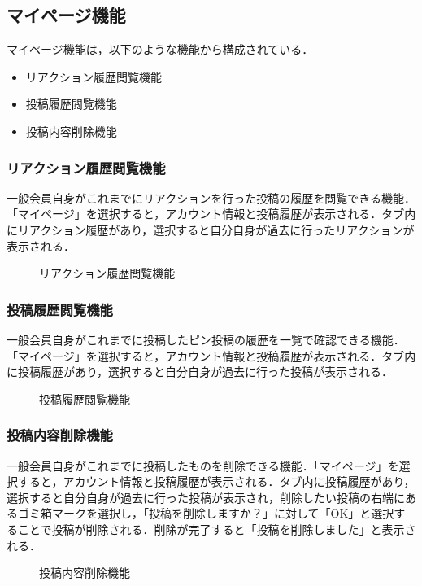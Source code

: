 \subsection{マイページ機能}
マイページ機能は，以下のような機能から構成されている．

\begin{itemize}
  \item リアクション履歴閲覧機能
  \item 投稿履歴閲覧機能
  \item 投稿内容削除機能
\end{itemize}

\subsubsection{リアクション履歴閲覧機能}
一般会員自身がこれまでにリアクションを行った投稿の履歴を閲覧できる機能．「マイページ」を選択すると，アカウント情報と投稿履歴が表示される．タブ内にリアクション履歴があり，選択すると自分自身が過去に行ったリアクションが表示される．


\begin{figure}[H]
    \centering
    
    \caption{リアクション履歴閲覧機能}
    \label{fig:mypage_gen1}
\end{figure}

\subsubsection{投稿履歴閲覧機能}
一般会員自身がこれまでに投稿したピン投稿の履歴を一覧で確認できる機能．「マイページ」を選択すると，アカウント情報と投稿履歴が表示される．タブ内に投稿履歴があり，選択すると自分自身が過去に行った投稿が表示される．



\begin{figure}[H]
    \centering
    
    \caption{投稿履歴閲覧機能}
    \label{fig:mypage_gen2}
\end{figure}




\subsubsection{投稿内容削除機能}

一般会員自身がこれまでに投稿したものを削除できる機能．「マイページ」を選択すると，アカウント情報と投稿履歴が表示される．タブ内に投稿履歴があり，選択すると自分自身が過去に行った投稿が表示され，削除したい投稿の右端にあるゴミ箱マークを選択し，「投稿を削除しますか？」に対して「OK」と選択することで投稿が削除される．削除が完了すると「投稿を削除しました」と表示される．


\begin{figure}[H]
    \centering
    
    \caption{投稿内容削除機能}
    \label{fig:mypage_gen3}
\end{figure}
